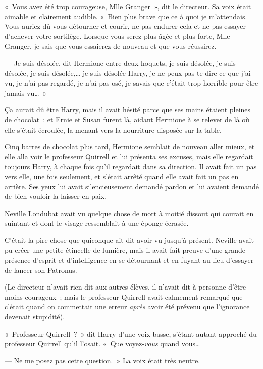 «~Vous avez été trop courageuse, Mlle Granger~», dit le directeur.
Sa voix était aimable et clairement audible.
«~Bien plus brave que ce à quoi je m'attendais.
Vous auriez dû vous détourner et courir, ne pas endurer cela et ne pas essayer d'achever votre sortilège.
Lorsque vous serez plus âgée et plus forte, Mlle Granger, je sais que vous essaierez de nouveau et que vous réussirez.

--- Je suis désolée, dit Hermione entre deux hoquets, je suis désolée, je suis désolée, je suis désolée,… je suis désolée Harry, je ne peux pas te dire ce que j'ai vu, je n'ai pas regardé, je n'ai pas osé, je savais que c'était trop horrible pour être jamais vu…~»

Ça aurait dû être Harry, mais il avait hésité parce que ses mains étaient pleines de chocolat~; et Ernie et Susan furent là, aidant Hermione à se relever de là où elle s'était écroulée, la menant vers la nourriture disposée sur la table.

Cinq barres de chocolat plus tard, Hermione semblait de nouveau aller mieux, et elle alla voir le professeur Quirrell et lui présenta ses excuses, mais elle regardait toujours Harry, à chaque fois qu'il regardait dans sa direction.
Il avait fait un pas vers elle, une fois seulement, et s'était arrêté quand elle avait fait un pas en arrière.
Ses yeux lui avait silencieusement demandé pardon et lui avaient demandé de bien vouloir la laisser en paix.

\later

Neville Londubat avait vu quelque chose de mort à moitié dissout qui courait en suintant et dont le visage ressemblait à une éponge écrasée.

C'était la pire chose que quiconque ait dit avoir vu jusqu'à présent.
Neville avait pu créer une petite étincelle de lumière, mais il avait fait preuve d'une grande présence d'esprit et d'intelligence en se détournant et en fuyant au lieu d'essayer de lancer son Patronus.

(Le directeur n'avait rien dit aux autres élèves, il n'avait dit à personne d'être moins courageux~; mais le professeur Quirrell avait calmement remarqué que c'était quand on commettait une erreur \emph{après} avoir été prévenu que l'ignorance devenait stupidité).

«~Professeur Quirrell~?~»
dit Harry d'une voix basse, s'étant autant approché du professeur Quirrell qu'il l'osait.
«~Que voyez-\emph{vous} quand vous…

--- Ne me posez pas cette question.~»
La voix était très neutre.

